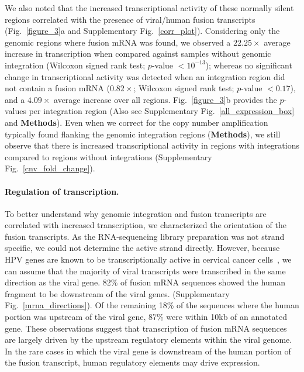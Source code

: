 \documentclass{bmcart}
\begin{document}
 We also noted that the increased transcriptional activity of these
 normally silent regions correlated with the presence of viral/human
 fusion transcripts (Fig.~\ref{figure_3}a
 and Supplementary Fig.~\ref{corr_plot}). Considering only the genomic regions where fusion
 mRNA was found, we observed a $22.25\times$ average increase in
 transcription when compared against samples without genomic
 integration (Wilcoxon signed rank test; $p$-value $<10^{-13}$);
 whereas no significant change in transcriptional activity was
 detected when an integration region did not contain a fusion mRNA
 ($0.82\times$; Wilcoxon signed rank test; $p$-value
 $<0.17$), and a $4.09\times$ average increase over all regions. Fig.~\ref{figure_3}b provides the $p$-values per
 integration region (Also see Supplementary Fig.~\ref{all_expression_box} and
 \textbf{Methods}).  Even when we correct for the copy number amplification typically found flanking the genomic
 integration regions (\textbf{Methods}), we still observe that there is increased transcriptional
 activity in regions with integrations compared to regions without integrations (Supplementary Fig.~\ref{cnv_fold_change}).


\paragraph{\textbf{Regulation of transcription}.} To better understand why genomic integration and fusion transcripts
are correlated with increased transcription, we characterized the
orientation of the fusion transcripts. As the RNA-sequencing library
preparation was not strand specific, we could not determine the active
strand directly. However, because HPV genes are known to be
transcriptionally active in cervical cancer
cells~\cite{Johansson2013}, we can assume that the majority of viral
transcripts were transcribed in the same direction as the viral
gene. 82\% of fusion mRNA sequences showed the human fragment to be
downstream of the viral genes.  (Supplementary Fig.~\ref{mrna_directions}). Of the
remaining 18\% of the sequences where the human portion was upstream
of the viral gene, 87\% were within 10kb of an annotated gene.  These
observations suggest that transcription of fusion mRNA sequences are
largely driven by the upstream regulatory elements within the viral
genome.  In the rare cases in which the viral gene is downstream of
the human portion of the fusion transcript, human regulatory elements
may drive expression.
\end{document}
